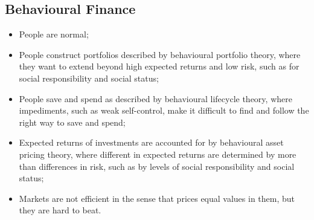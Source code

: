 \documentclass[11pt,a4paper]{report}
\begin{document}
\subsection{Behavioural Finance}
\begin{itemize}
    \item People are normal;
    \item People construct portfolios described by behavioural portfolio theory, where they want to extend beyond high expected returns and low risk, such as for social responsibility and social status;
    \item People save and spend as described by behavioural lifecycle theory, where impediments, such as weak self-control, make it difficult to find and follow the right way to save and spend;
    \item Expected returns of investments are accounted for by behavioural asset pricing theory, where different in expected returns are determined by more than differences in risk, such as by levels of social responsibility and social status;
    \item Markets are not efficient in the sense that prices equal values in them, but they are hard to beat.
\end{itemize}
\end{document}
